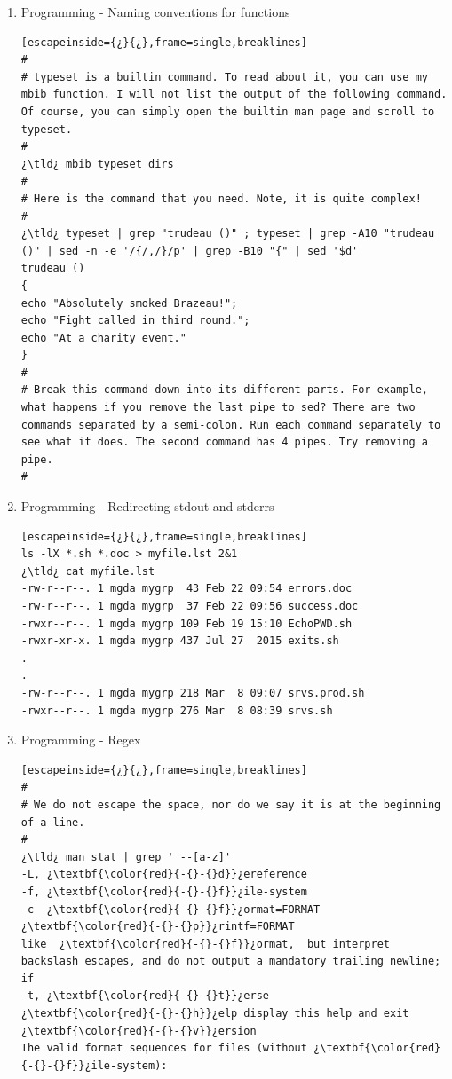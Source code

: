 \begin{enumerate}
\item\hypertarget{prgrm_typeset}{Programming - Naming conventions for functions}
\begin{lstlisting}[escapeinside={¿}{¿},frame=single,breaklines]
#
# typeset is a builtin command. To read about it, you can use my mbib function. I will not list the output of the following command. Of course, you can simply open the builtin man page and scroll to typeset.
#
¿\tld¿ mbib typeset dirs
#
# Here is the command that you need. Note, it is quite complex!
#
¿\tld¿ typeset | grep "trudeau ()" ; typeset | grep -A10 "trudeau ()" | sed -n -e '/{/,/}/p' | grep -B10 "{" | sed '$d'
trudeau () 
{ 
echo "Absolutely smoked Brazeau!";
echo "Fight called in third round.";
echo "At a charity event."
}
#
# Break this command down into its different parts. For example, what happens if you remove the last pipe to sed? There are two commands separated by a semi-colon. Run each command separately to see what it does. The second command has 4 pipes. Try removing a pipe.
#
\end{lstlisting}

\item\hypertarget{sortbyfileext}{Programming - Redirecting stdout and stderrs}
\begin{lstlisting}[escapeinside={¿}{¿},frame=single,breaklines]
ls -lX *.sh *.doc > myfile.lst 2&1
¿\tld¿ cat myfile.lst
-rw-r--r--. 1 mgda mygrp  43 Feb 22 09:54 errors.doc
-rw-r--r--. 1 mgda mygrp  37 Feb 22 09:56 success.doc
-rwxr--r--. 1 mgda mygrp 109 Feb 19 15:10 EchoPWD.sh
-rwxr-xr-x. 1 mgda mygrp 437 Jul 27  2015 exits.sh
.
.
-rw-r--r--. 1 mgda mygrp 218 Mar  8 09:07 srvs.prod.sh
-rwxr--r--. 1 mgda mygrp 276 Mar  8 08:39 srvs.sh
\end{lstlisting}

\item\hypertarget{searchspaceminus}{Programming - Regex}
\begin{lstlisting}[escapeinside={¿}{¿},frame=single,breaklines]
#
# We do not escape the space, nor do we say it is at the beginning of a line.
#
¿\tld¿ man stat | grep ' --[a-z]'
-L, ¿\textbf{\color{red}{-{}-{}d}}¿ereference
-f, ¿\textbf{\color{red}{-{}-{}f}}¿ile-system
-c  ¿\textbf{\color{red}{-{}-{}f}}¿ormat=FORMAT
¿\textbf{\color{red}{-{}-{}p}}¿rintf=FORMAT
like  ¿\textbf{\color{red}{-{}-{}f}}¿ormat,  but interpret backslash escapes, and do not output a mandatory trailing newline; if
-t, ¿\textbf{\color{red}{-{}-{}t}}¿erse
¿\textbf{\color{red}{-{}-{}h}}¿elp display this help and exit
¿\textbf{\color{red}{-{}-{}v}}¿ersion
The valid format sequences for files (without ¿\textbf{\color{red}{-{}-{}f}}¿ile-system):
\end{lstlisting}



\end{enumerate}
